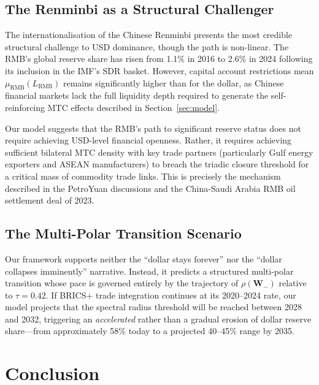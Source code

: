 \documentclass[12pt, letterpaper]{article}
\theoremstyle{definition}
\begin{document}
\subsection{The Renminbi as a Structural Challenger}

The internationalisation of the Chinese Renminbi presents the most credible structural challenge to USD dominance, though the path is non-linear. The RMB's global reserve share has risen from 1.1\% in 2016 to 2.6\% in 2024 following its inclusion in the IMF's SDR basket. However, capital account restrictions mean $\mu_{\text{RMB}}(L_{\text{RMB}})$ remains significantly higher than for the dollar, as Chinese financial markets lack the full liquidity depth required to generate the self-reinforcing MTC effects described in Section~\ref{sec:model}.

Our model suggests that the RMB's path to significant reserve status does not require achieving USD-level financial openness. Rather, it requires achieving sufficient bilateral MTC density with key trade partners (particularly Gulf energy exporters and ASEAN manufacturers) to breach the triadic closure threshold for a critical mass of commodity trade links. This is precisely the mechanism described in the PetroYuan discussions and the China-Saudi Arabia RMB oil settlement deal of 2023.

\subsection{The Multi-Polar Transition Scenario}

Our framework supports neither the ``dollar stays forever'' nor the ``dollar collapses imminently'' narrative. Instead, it predicts a structured multi-polar transition whose pace is governed entirely by the trajectory of $\rho(\mathbf{W}_-)$ relative to $\tau = 0.42$. If BRICS+ trade integration continues at its 2020--2024 rate, our model projects that the spectral radius threshold will be reached between 2028 and 2032, triggering an \textit{accelerated} rather than a gradual erosion of dollar reserve share---from approximately 58\% today to a projected 40--45\% range by 2035.

\newpage
\section{Conclusion}
\label{sec:conclusion}
\end{document}
